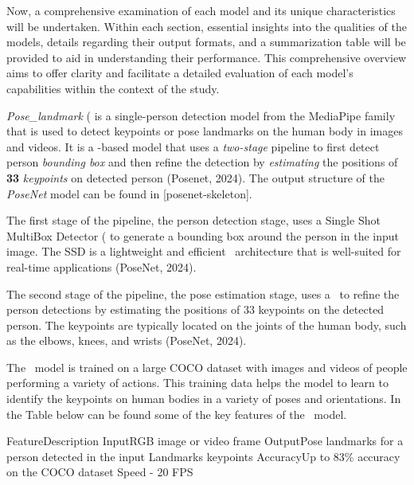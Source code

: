 Now, a comprehensive examination of each model and its unique characteristics will be undertaken. Within each section, essential insights into the qualities of the models, details regarding their output formats, and a summarization table will be provided to aid in understanding their performance. This comprehensive overview aims to offer clarity and facilitate a detailed evaluation of each model's capabilities within the context of the study.

{\em Pose_landmark} (\PoseNet\) is a single-person detection model from the MediaPipe family that is used to detect keypoints or pose landmarks on the human body in images and videos. It is a \CNN\--based model that uses a {\em two-stage} pipeline to first detect person {\em bounding box} and then refine the detection by {\em estimating} the positions of {\bf 33} {\em keypoints} on detected person (\scc Posenet, 2024). The output structure of the {\em PoseNet} model can be found in [posenet-skeleton].

The first stage of the pipeline, the person detection stage, uses a Single Shot MultiBox Detector (\SSD\) to generate a bounding box around the person in the input image. The SSD is a lightweight and efficient \CNN\ architecture that is well-suited for real-time applications (\scc PoseNet, 2024).

The second stage of the pipeline, the pose estimation stage, uses a \CNN\ to refine the person detections by estimating the positions of 33 keypoints on the detected person. The keypoints are typically located on the joints of the human body, such as the elbows, knees, and wrists (\scc PoseNet, 2024).

The \PoseNet\ model is trained on a large COCO dataset with images and videos of people performing a variety of actions. This training data helps the model to learn to identify the keypoints on human bodies in a variety of poses and orientations. In the Table below can be found some of the key features of the \PoseNet\ model.

    \setupTABLE[r][1][style=bold]
    \setupTABLE[c][each][offset=3dd]
    \setupTABLE[frame=off]
    \setupTABLE[r][1][topframe=on,bottomframe=on]
    \setupTABLE[c][each][leftframe=on]
    \setupTABLE[c][1][leftframe=off]
    \bTR
        \bTD Feature\eTD\bTD    Description\eTD\eTR
    \bTR
        \bTD Input\eTD\bTD      RGB image or video frame\eTD\eTR
    \bTR
            \bTD Output\eTD\bTD     Pose landmarks for a person detected in the input\eTD\eTR
    \bTR
        \bTD Landmarks\eTD{} keypoints\eTD\eTR
    \bTR
        \bTD Accuracy\eTD\bTD   Up to 83\% accuracy on the COCO dataset\eTD\eTR
    \bTR
        \bTD Speed\eTD{} - 20 FPS\eTD\eTR

